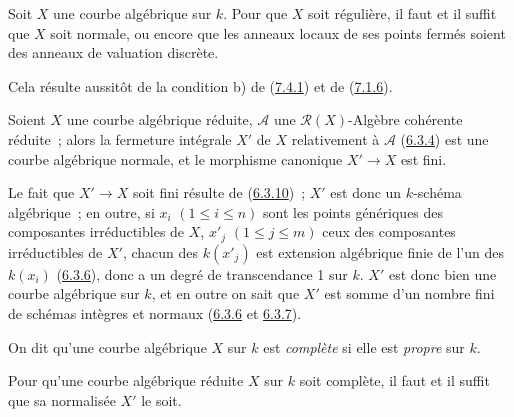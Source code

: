 \begin{corollary}[7.4.5]
\label{II.7.4.5-fr}
Soit $X$ une courbe algébrique sur $k$. Pour que $X$ soit régulière, il faut et
il suffit que $X$ soit normale, ou encore que les anneaux locaux de ses points
fermés soient des anneaux de valuation discrète.
\end{corollary}

Cela résulte aussitôt de la condition b) de
(\hyperref[II.7.4.1-fr]{7.4.1}) et de
(\hyperref[II.7.1.6-fr]{7.1.6}).

\begin{corollary}[7.4.6]
\label{II.7.4.6-fr}
Soient $X$ une courbe algébrique réduite, $\mathcal{A}$ une
$\mathcal{R}(X)$-Algèbre cohérente réduite~; alors la fermeture intégrale $X'$
de $X$ relativement à $\mathcal{A}$ (\hyperref[II.6.3.4-fr]{6.3.4}) est une
courbe algébrique normale, et le morphisme canonique $X'\to X$ est fini.
\end{corollary}

Le fait que $X'\to X$ soit fini résulte de
(\hyperref[II.6.3.10-fr]{6.3.10})~; $X'$ est donc un $k$-schéma algébrique~;
en outre, si $x_i$ $(1\leq i\leq n)$ sont les points génériques des composantes
irréductibles de $X$, $x'_j$ $(1\leq j\leq m)$ ceux des composantes
irréductibles de $X'$, chacun des $k(x'_j)$ est extension algébrique finie de
l'un des $k(x_i)$ (\hyperref[II.6.3.6-fr]{6.3.6}), donc a un degré de
transcendance 1 sur $k$. $X'$ est donc bien une courbe algébrique sur $k$, et
en outre on sait que $X'$ est somme d'un nombre fini de schémas intègres et
normaux (\hyperref[II.6.3.6-fr]{6.3.6} et
\hyperref[II.6.3.7-fr]{6.3.7}).

\begin{env}[7.4.7]
\label{II.7.4.7-fr}
On dit qu'une courbe algébrique $X$ sur $k$ est \emph{complète} si elle est
\emph{propre} sur $k$.
\end{env}

\begin{corollary}[7.4.8]
\label{II.7.4.8-fr}
Pour qu'une courbe algébrique réduite $X$ sur $k$ soit complète, il faut et il
suffit que sa normalisée $X'$ le soit.
\end{corollary}

